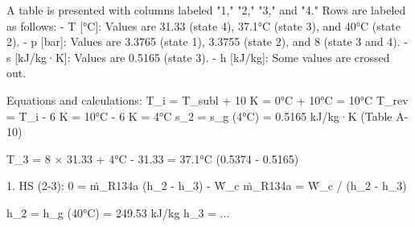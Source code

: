 A table is presented with columns labeled "1," "2," "3," and "4." Rows are labeled as follows:  
- T [°C]: Values are 31.33 (state 4), 37.1°C (state 3), and 40°C (state 2).  
- p [bar]: Values are 3.3765 (state 1), 3.3755 (state 2), and 8 (state 3 and 4).  
- s [kJ/kg·K]: Values are 0.5165 (state 3).  
- h [kJ/kg]: Some values are crossed out.  

Equations and calculations:  
T_i = T_subl + 10 K = 0°C + 10°C = 10°C  
T_rev = T_i - 6 K = 10°C - 6 K = 4°C  
s_2 = s_g (4°C) = 0.5165 kJ/kg·K (Table A-10)  

T_3 = 8 × 31.33 + 4°C - 31.33 = 37.1°C  
(0.5374 - 0.5165)  

1. HS (2-3):  
0 = ṁ_R134a (h_2 - h_3) - Ẇ_c  
ṁ_R134a = Ẇ_c / (h_2 - h_3)  

h_2 = h_g (40°C) = 249.53 kJ/kg  
h_3 = ...
